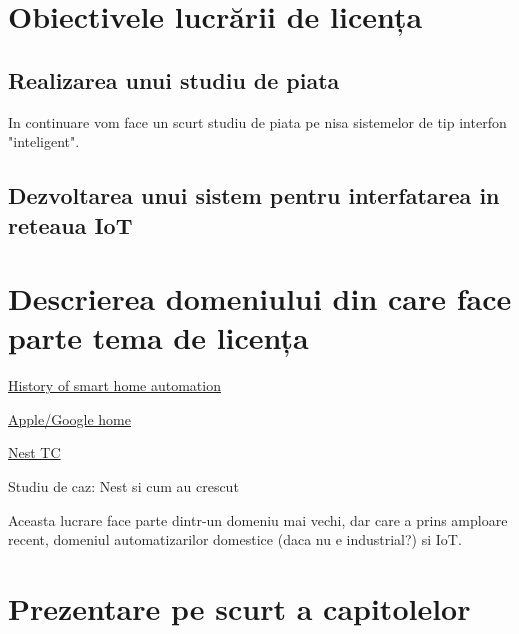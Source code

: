 \section {Obiectivele lucrării de licența}

\subsection {Realizarea unui studiu de piata}

In continuare vom face un scurt studiu de piata pe nisa sistemelor de tip interfon "inteligent".

\subsection {Dezvoltarea unui sistem pentru interfatarea in reteaua IoT}

\section {Descrierea domeniului din care face parte tema de licența}

\href{https://zeusintegrated.com/blog/item/a-brief-history-of-smart-home-automation}{History of smart home automation}

\href{https://www.familyhandyman.com/article/the-history-of-smart-home-technology/}{Apple/Google home}

\href{https://techcrunch.com/2013/05/11/from-the-garage-to-200-employees-in-3-years-how-nest-thermostats-were-born/}{Nest TC}

Studiu de caz: Nest si cum au crescut


Aceasta lucrare face parte dintr-un domeniu mai vechi, dar care a prins amploare recent, domeniul automatizarilor domestice (daca nu e industrial?) si IoT. 

\section {Prezentare pe scurt a capitolelor}

